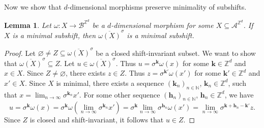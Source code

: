 \documentclass[12pt]{amsart}
\newtheorem{lemma}[definition]{Lemma}
\newcommand{\N}{\mathbb{N}}
\newcommand{\Z}{\mathbb{Z}}
\newcommand{\bh}{{\boldsymbol{h}}}
\newcommand{\bk}{{\boldsymbol{k}}}
\newcommand{\Acal}{\mathcal{A}} %
\newcommand{\Bcal}{\mathcal{B}}
\newcommand{\factorialclosure}[1]{{\overline{#1}^{Fact}}}
\newcommand{\shiftclosure}[1]{{\overline{#1}^{\sigma}}}
\begin{document}

Now we show that $d$-dimensional morphisms preserve minimality of subshifts.

\begin{lemma}\label{lem:minimal-implies-minimal}
    Let $\omega:X\to\Bcal^{\Z^d}$ be a $d$-dimensional morphism for some 
    $X\subseteq\Acal^{\Z^d}$.
    If $X$ is a minimal subshift, then $\shiftclosure{\omega(X)}$ is
    a minimal subshift.
\end{lemma}

\begin{proof}
    Let $\varnothing\neq Z\subseteq\shiftclosure{\omega(X)}$ be a closed
    shift-invariant subset.
    We want to show that $\shiftclosure{\omega(X)}\subseteq Z$.
    Let $u\in\shiftclosure{\omega(X)}$.
    Thus $u=\sigma^\bk\omega(x)$ for some $\bk\in\Z^d$ and $x\in X$.
    Since $Z\neq\varnothing$, there exists $z\in Z$.
    Thus $z=\sigma^{\bk'}\omega(x')$ for some $\bk'\in\Z^d$ and $x'\in X$.
    Since $X$ is minimal, there exists a sequence $(\bk_n)_{n\in\N}$,
    $\bk_n\in\Z^d$, such that $x=\lim_{n\to\infty}\sigma^{\bk_n} x'$.
    For some other sequence $(\bh_n)_{n\in\N}$, $\bh_n\in\Z^d$, we have
    \begin{equation*}
        u 
        = \sigma^\bk\omega(x) 
        = \sigma^\bk\omega\left(\lim_{n\to\infty}\sigma^{\bk_n} x'\right) 
        = \sigma^\bk\lim_{n\to\infty}\sigma^{\bh_n} \omega\left(x'\right)
        = \lim_{n\to\infty}\sigma^{\bk+\bh_n-\bk'} z.
    \end{equation*}
    Since $Z$ is closed and shift-invariant, it follows that $u\in Z$.
\end{proof}
\end{document}
